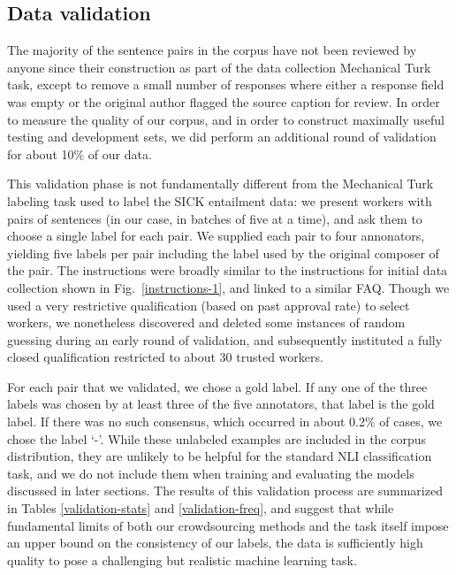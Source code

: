 \subsection{Data validation}

The majority of the sentence pairs in the corpus have not been reviewed by anyone since their construction as part of the data collection Mechanical Turk task, except to remove a small number of responses where either a response field was empty or the original author flagged the source caption for review. In order to measure the quality of our corpus, and in order to construct maximally useful testing and development sets, we did perform an additional round of validation for about 10\% of our data.

This validation phase is not fundamentally different from the Mechanical Turk labeling task used to label the SICK entailment data: we present workers with pairs of sentences (in our case, in batches of five at a time), and ask them to choose a single label for each pair. We supplied each pair to four annonators, yielding five labels per pair including the label used by the original composer of the pair. The instructions were broadly similar to the instructions for initial data collection shown in Fig.~\ref{instructions-1}, and linked to a similar FAQ. Though we used a very restrictive qualification (based on past approval rate) to select workers, we nonetheless discovered and deleted some instances of random guessing during an early round of validation, and subsequently instituted a fully closed qualification restricted to about 30 trusted workers.

For each pair that we validated, we chose a gold label. If any one of the three labels was chosen by at least three of the five annotators, that label is the gold label. If there was no such consensus, which occurred in about 0.2\% of cases, we chose the label `-'. While these unlabeled examples are included in the corpus distribution, they are unlikely to be helpful for the standard NLI classification task, and we do not include them when training and evaluating the models discussed in later sections. The results of this validation process are summarized in Tables \ref{validation-stats} and \ref{validation-freq}, and suggest that while fundamental limits of both our crowdsourcing methods and the task itself impose an upper bound on the consistency of our labels, the data is sufficiently high quality to pose a challenging but realistic machine learning task.

